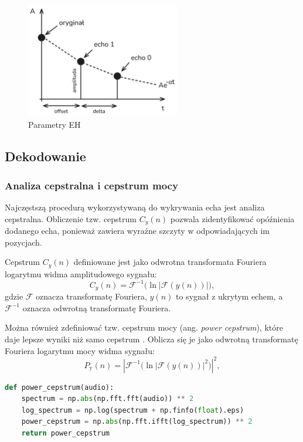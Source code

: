 \begin{figure}[ht!]
	\centering
	\includegraphics[width=0.6\textwidth]{img/echo-hiding.png}
	\caption{\label{fig:echo-hiding} Parametry EH}
\end{figure}
\pagebreak


\subsection{Dekodowanie}

\subsubsection{Analiza cepstralna i cepstrum mocy}

Najczęstszą procedurą wykorzystywaną do wykrywania echa jest analiza cepstralna.
Obliczenie tzw. cepstrum $C_y(n)$ pozwala zidentyfikować opóźnienia dodanego echa, ponieważ zawiera wyraźne szczyty w odpowiadających im pozycjach.

Cepstrum $C_y(n)$ definiowane jest jako odwrotna transformata Fouriera logarytmu widma amplitudowego sygnału:
\begin{equation}
	C_y(n) = \mathcal{F}^{-1} \big(\ln |\mathcal{F}(y(n))|\big),
\end{equation}
gdzie $\mathcal{F}$ oznacza transformatę Fouriera, $y(n)$ to sygnał z ukrytym echem, a $\mathcal{F}^{-1}$ oznacza odwrotną transformatę Fouriera.

Można również zdefiniować tzw. cepstrum mocy (ang. \textit{power cepstrum}), które daje lepsze wyniki niż samo cepstrum \cite{auto_power_cepstrum}. Oblicza się je jako odwrotną transformatę Fouriera logarytmu mocy widma sygnału:
\begin{equation}
	P_{\text{y}}(n) = \left| \mathcal{F}^{-1} \big( \ln |\mathcal{F}(y(n))|^2 \big) \right|^2,
\end{equation}

\begin{lstlisting}[language=Python,caption={Fragment kodu liczącego cepstrum mocy}]
def power_cepstrum(audio):
    spectrum = np.abs(np.fft.fft(audio)) ** 2
    log_spectrum = np.log(spectrum + np.finfo(float).eps)
    power_cepstrum = np.abs(np.fft.ifft(log_spectrum)) ** 2
    return power_cepstrum
\end{lstlisting}

